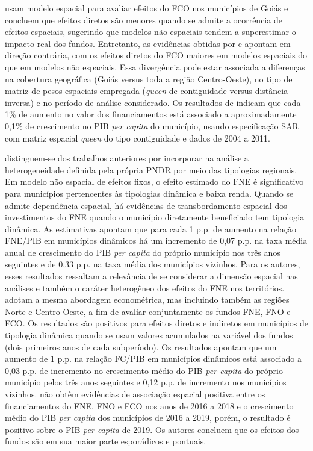  usam modelo espacial para avaliar efeitos do FCO nos municípios de Goiás e concluem que efeitos diretos são menores quando se admite a ocorrência de efeitos espaciais, sugerindo que modelos não espaciais tendem a superestimar o impacto real dos fundos. Entretanto, as evidências obtidas por  e  apontam em direção contrária, com os efeitos diretos do FCO maiores em modelos espaciais do que em modelos não espaciais. Essa divergência pode estar associada a diferenças na cobertura geográfica (Goiás versus toda a região Centro-Oeste), no tipo de matriz de pesos espaciais empregada (\textit{queen} de contiguidade versus distância inversa) e no período de análise considerado. Os resultados de  indicam que cada 1\% de aumento no valor dos financiamentos está associado a aproximadamente 0,1\% de crescimento no PIB \textit{per capita} do município, usando especificação SAR com matriz espacial \textit{queen} do tipo contiguidade e dados de 2004 a 2011.

 distinguem-se dos trabalhos anteriores por incorporar na análise a heterogeneidade definida pela própria PNDR por meio das tipologias regionais. Em modelo não espacial de efeitos fixos, o efeito estimado do FNE é significativo para municípios pertencentes às tipologias dinâmica e baixa renda. Quando se admite dependência espacial, há evidências de transbordamento espacial dos investimentos do FNE quando o município diretamente beneficiado tem tipologia dinâmica. As estimativas apontam que para cada 1 p.p. de aumento na relação FNE/PIB em municípios dinâmicos há um incremento de 0,07 p.p. na taxa média anual de crescimento do PIB \textit{per capita} do próprio município nos três anos seguintes e de 0,33 p.p. na taxa média dos municípios vizinhos. Para os autores, esses resultados ressaltam a relevância de se considerar a dimensão espacial nas análises e também o caráter heterogêneo dos efeitos do FNE nos territórios.  adotam a mesma abordagem econométrica, mas incluindo também as regiões Norte e Centro-Oeste, a fim de avaliar conjuntamente os fundos FNE, FNO e FCO. Os resultados são positivos para efeitos diretos e indiretos em municípios de tipologia dinâmica quando se usam valores acumulados na variável dos fundos (dois primeiros anos de cada subperíodo). Os resultados apontam que um aumento de 1 p.p. na relação FC/PIB em municípios dinâmicos está associado a 0,03 p.p. de incremento no crescimento médio do PIB \textit{per capita} do próprio município pelos três anos seguintes e 0,12 p.p. de incremento nos municípios vizinhos.  não obtêm evidências de associação espacial positiva entre os financiamentos do FNE, FNO e FCO nos anos de 2016 a 2018 e o crescimento médio do PIB \textit{per capita} dos municípios de 2016 a 2019, porém, o resultado é positivo sobre o PIB \textit{per capita} de 2019. Os autores concluem que os efeitos dos fundos são em sua maior parte esporádicos e pontuais.

